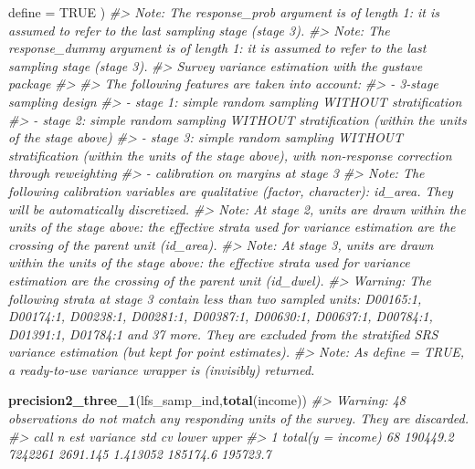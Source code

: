 \documentclass[
]{article}
\newenvironment{Shaded}{\begin{snugshade}}{\end{snugshade}}
\newcommand{\AttributeTok}[1]{\textcolor[rgb]{0.13,0.29,0.53}{#1}}
\newcommand{\CommentTok}[1]{\textcolor[rgb]{0.56,0.35,0.01}{\textit{#1}}}
\newcommand{\ConstantTok}[1]{\textcolor[rgb]{0.56,0.35,0.01}{#1}}
\newcommand{\FunctionTok}[1]{\textcolor[rgb]{0.13,0.29,0.53}{\textbf{#1}}}
\newcommand{\NormalTok}[1]{#1}
\begin{document}
\begin{Shaded}
\begin{Highlighting}[]
  \AttributeTok{define =} \ConstantTok{TRUE}
\NormalTok{)}
\CommentTok{\#\textgreater{} Note: The response\_prob argument is of length 1: it is assumed to refer to the last sampling stage (stage 3).}
\CommentTok{\#\textgreater{} Note: The response\_dummy argument is of length 1: it is assumed to refer to the last sampling stage (stage 3).}
\CommentTok{\#\textgreater{} Survey variance estimation with the gustave package}
\CommentTok{\#\textgreater{} }
\CommentTok{\#\textgreater{} The following features are taken into account:}
\CommentTok{\#\textgreater{}   {-} 3{-}stage sampling design}
\CommentTok{\#\textgreater{}   {-} stage 1: simple random sampling WITHOUT stratification}
\CommentTok{\#\textgreater{}   {-} stage 2: simple random sampling WITHOUT stratification (within the units of the stage above)}
\CommentTok{\#\textgreater{}   {-} stage 3: simple random sampling WITHOUT stratification (within the units of the stage above), with non{-}response correction through reweighting}
\CommentTok{\#\textgreater{}   {-} calibration on margins at stage 3}
\CommentTok{\#\textgreater{} Note: The following calibration variables are qualitative (factor, character): id\_area. They will be automatically discretized.}
\CommentTok{\#\textgreater{} Note: At stage 2, units are drawn within the units of the stage above: the effective strata used for variance estimation are the crossing of the parent unit (id\_area).}
\CommentTok{\#\textgreater{} Note: At stage 3, units are drawn within the units of the stage above: the effective strata used for variance estimation are the crossing of the parent unit (id\_dwel).}
\CommentTok{\#\textgreater{} Warning: The following strata at stage 3 contain less than two sampled units: D00165:1, D00174:1, D00238:1, D00281:1, D00387:1, D00630:1, D00637:1, D00784:1, D01391:1, D01784:1 and 37 more. They are excluded from the stratified SRS variance estimation (but kept for point estimates).}
\CommentTok{\#\textgreater{} Note: As define = TRUE, a ready{-}to{-}use variance wrapper is (invisibly) returned.}

\FunctionTok{precision2\_three\_1}\NormalTok{(lfs\_samp\_ind,}\FunctionTok{total}\NormalTok{(income))}
\CommentTok{\#\textgreater{} Warning: 48 observations do not match any responding units of the survey. They are discarded.}
\CommentTok{\#\textgreater{}                call  n      est variance      std       cv    lower    upper}
\CommentTok{\#\textgreater{} 1 total(y = income) 68 190449.2  7242261 2691.145 1.413052 185174.6 195723.7}
\end{Highlighting}
\end{Shaded}
\end{document}
